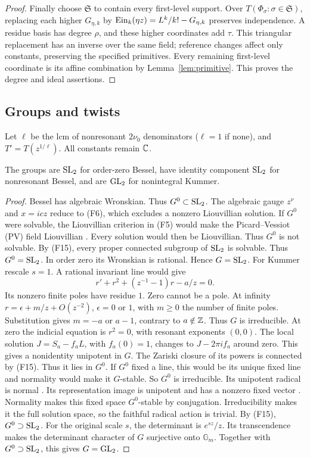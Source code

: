 \begin{proof}
Finally choose $\mathfrak S$ to contain every first-level support.
Over $T(\Phi_\sigma:\sigma\in\mathfrak S)$, replacing each higher
$G_{\eta,k}$ by $\operatorname{Ein}_k(\eta z)=L^k/k!-G_{\eta,k}$ preserves independence.
A residue basis has degree $\rho$, and these higher coordinates add
$\tau$. This triangular replacement has an inverse over the same field;
reference changes affect only constants, preserving the specified primitives.
Every remaining first-level coordinate is its affine combination
by Lemma~\ref{lem:primitive}. This proves the degree and ideal assertions.
\end{proof}

\subsection{Groups and twists}
Let $\ell$ be the lcm of nonresonant $2\nu_0$ denominators ($\ell=1$ if
none), and $T'=T(z^{1/\ell})$. All constants remain $\mathbb{C}$.
\begin{lemma}\label{lem:groups}
The groups are $\operatorname{SL}_2$ for order-zero Bessel, have identity component
$\operatorname{SL}_2$ for nonresonant Bessel, and are $\operatorname{GL}_2$ for nonintegral Kummer.
\end{lemma}
\begin{proof}
Bessel has algebraic Wronskian. Thus $G^0\subset\operatorname{SL}_2$.
The algebraic gauge $z^\nu$ and $x=icz$ reduce to (F6), which excludes
a nonzero Liouvillian solution. If $G^0$ were solvable, the Liouvillian criterion in (F5) would make
the Picard--Vessiot (PV) field Liouvillian \cite[Theorem~1.43, pp.~33--34]{VanDerPutSinger2002Draft}. Every solution would then be Liouvillian. Thus $G^0$ is
not solvable. By (F15), every proper connected subgroup of $\operatorname{SL}_2$
is solvable. Thus $G^0=\operatorname{SL}_2$. In order zero its Wronskian
is rational. Hence $G=\operatorname{SL}_2$.
For Kummer rescale $s=1$. A rational invariant line would give
\begin{equation}\label{eq:core-Riccati}
r'+r^2+(z^{-1}-1)r-a/z=0.
\end{equation}
Its nonzero finite poles have residue $1$. Zero cannot be a pole.
At infinity $r=\epsilon+m/z+O(z^{-2})$, $\epsilon=0$ or $1$, with
$m\ge0$ the number of finite poles. Substitution gives $m=-a$ or $a-1$,
contrary to $a\notin\mathbb{Z}$. Thus $G$ is irreducible.
At zero the indicial equation is $r^2=0$, with resonant exponents $(0,0)$.
The local solution $J=S_a-f_aL$, with $f_a(0)=1$, changes to
$J-2\pi i f_a$ around zero. This gives a nonidentity unipotent in $G$. The Zariski closure of its powers is connected by (F15). Thus it lies in
$G^0$. If $G^0$ fixed a line, this
would be its unique fixed line and normality would make it $G$-stable.
So $G^0$ is irreducible. Its unipotent radical is normal
\cite[\S11.21, p.~157]{Borel1991}.
Its representation image is unipotent \cite[\S4.5, p.~85]{Borel1991}
and has a nonzero fixed vector \cite[\S17.5, Theorem, p.~112]{Humphreys1975}.
Normality makes this fixed space $G^0$-stable by conjugation.
Irreducibility makes it the full solution space, so the faithful radical
action is trivial. By (F15), $G^0\supset\operatorname{SL}_2$.
For the original scale $s$, the determinant is $e^{sz}/z$.
Its transcendence makes the determinant character of $G$ surjective
onto $\mathbb G_m$. Together with $G^0\supset\operatorname{SL}_2$, this gives $G=\operatorname{GL}_2$.
\end{proof}
